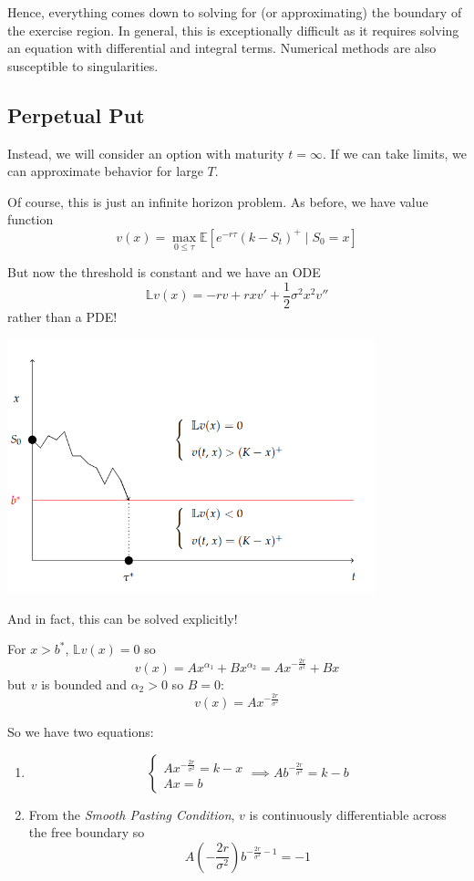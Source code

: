 \documentclass[12pt]{report}
\newcommand{\E}{\mathbb{E}}
\renewcommand{\L}{\mathbb{L}}
\begin{document}
        Hence, everything comes down to solving for (or approximating) the boundary of the exercise region. In general, this is exceptionally difficult as it requires solving an equation with differential and integral terms. Numerical methods are also susceptible to singularities.  

    \subsection{Perpetual Put}  
        Instead, we will consider an option with maturity $t = \infty$. If we can take limits, we can approximate behavior for large $T$. 

        Of course, this is just an infinite horizon problem. As before, we have value function 
        \[v(x) = \max_{0 \leq \tau} \E[e^{-r\tau} (k - S_t)^+ \; | \; S_0 = x]\]

        But now the threshold is constant and we have an ODE 
        \[\L v(x) = -rv + rxv' + \frac{1}{2}\sigma^2 x^2 v''\]
        rather than a PDE!

        \begin{center}
            \includegraphics[width=0.8\textwidth]{Images/ODE Boundary.png}
        \end{center}

        And in fact, this can be solved explicitly! 

        For $x > b^*$, $\L v(x) = 0$ so 
        \[v(x) = Ax^{\alpha_1} + Bx^{\alpha_2} = Ax^{-\frac{2r}{\sigma^2}} + Bx\]
        but $v$ is bounded and $\alpha_2 > 0$ so $B = 0$: 
        \[v(x) = Ax^{-\frac{2r}{\sigma^2}}\]

        So we have two equations:
        \begin{enumerate}
            \item
            \[\begin{cases}
                Ax^{-\frac{2r}{\sigma^2}} = k - x\\ 
                Ax = b
            \end{cases} \implies Ab^{-\frac{2r}{\sigma^2}} = k - b\] 

            \item From the \emph{Smooth Pasting Condition}, $v$ is continuously differentiable across the free boundary so 
            \[A(-\frac{2r}{\sigma^2})b^{-\frac{2r}{\sigma^2} - 1} = -1\]
        \end{enumerate}
\end{document}
